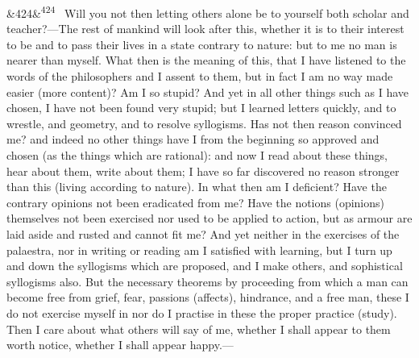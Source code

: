 \documentclass[12pt]{article}
\newcommand{\para}[1][]{\par\noindent\ifx&#1&\else\textsuperscript{\footnotesize #1}~\fi}
\begin{document}
\para[424] Will you not then letting others alone be to yourself both scholar and teacher?—The rest of mankind will look after this, whether it is to their interest to be and to pass their lives in a state contrary to nature: but to me no man is nearer than myself. What then is the meaning of this, that I have listened to the words of the philosophers and I assent to them, but in fact I am no way made easier (more content)? Am I so stupid? And yet in all other things such as I have chosen, I have not been found very stupid; but I learned letters quickly, and to wrestle, and geometry, and to resolve syllogisms. Has not then reason convinced me? and indeed no other things have I from the beginning so approved and chosen (as the things which are rational): and now I read about these things, hear about them, write about them; I have so far discovered no reason stronger than this (living according to nature). In what then am I deficient? Have the contrary opinions not been eradicated from me? Have the notions (opinions) themselves not been exercised nor used to be applied to action, but as armour are laid aside and rusted and cannot fit me? And yet neither in the exercises of the palaestra, nor in writing or reading am I satisfied with learning, but I turn up and down the syllogisms which are proposed, and I make others, and sophistical syllogisms also. But the necessary theorems by proceeding from which a man can become free from grief, fear, passions (affects), hindrance, and a free man, these I do not exercise myself in nor do I practise in these the proper practice (study). Then I care about what others will say of me, whether I shall appear to them worth notice, whether I shall appear happy.—
\end{document}
